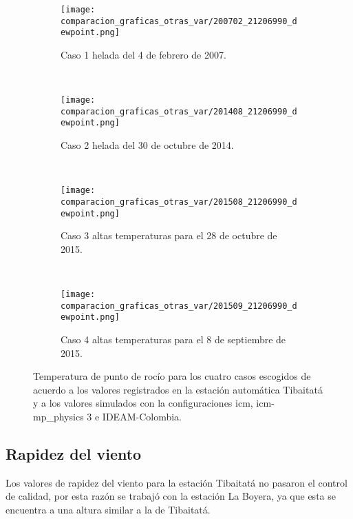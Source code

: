 \begin{figure}[H]
    
\begin{subfigure}[normla]{0.4\textwidth}
\caption{Caso 1 helada del 4 de febrero de 2007.}
\label{caso1_tiba_wrf_dp}
\texttt{[image: comparacion\_graficas\_otras\_var/200702\_21206990\_dewpoint.png]}
\end{subfigure}
~
\begin{subfigure}[normla]{0.4\textwidth}
\caption{Caso 2 helada del 30 de octubre de 2014.}
\label{caso2_tiba_wrf_dp}
\texttt{[image: comparacion\_graficas\_otras\_var/201408\_21206990\_dewpoint.png]}
\end{subfigure}
~
\centering
\begin{subfigure}[normla]{0.4\textwidth}
\caption{Caso 3 altas temperaturas para el 28 de octubre de 2015.}
\label{caso3_tiba_wrf_dp}
\texttt{[image: comparacion\_graficas\_otras\_var/201508\_21206990\_dewpoint.png]}
\end{subfigure}
~
\centering
\begin{subfigure}[normla]{0.4\textwidth}
\caption{Caso 4 altas temperaturas para el 8 de septiembre de 2015.}
\label{caso4_tiba_wrf_dp}
\texttt{[image: comparacion\_graficas\_otras\_var/201509\_21206990\_dewpoint.png]}
\end{subfigure}

    \caption{Temperatura de punto de rocío para los cuatro casos escogidos de acuerdo a los valores registrados en la estación automática Tibaitatá y a los valores simulados con la configuraciones icm, icm-mp\_physics 3 e IDEAM-Colombia.}
    \label{fig:wrf_dp_tibaitata}
\end{figure}


\subsection{Rapidez del viento}

Los valores de rapidez del viento para la estación Tibaitatá no pasaron el control de calidad, por esta razón se trabajó con la estación La Boyera, ya que esta se encuentra a una altura similar a la de Tibaitatá.\\

